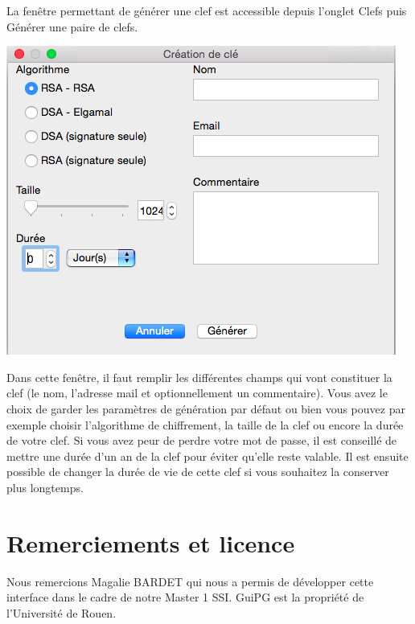 \documentclass[a4paper,11pt,french]{article}
\begin{document}
La fenêtre permettant de générer une clef est accessible depuis l'onglet Clefs puis Générer une paire de clefs. \bigbreak

\includegraphics[scale=0.5]{creation.png} \bigbreak


Dans cette fenêtre, il faut remplir les différentes champs qui vont constituer la clef (le nom, l'adresse mail et optionnellement un commentaire). 
Vous avez le choix de garder les paramètres de génération par défaut ou bien vous pouvez par exemple choisir l'algorithme de chiffrement, la taille de la clef ou encore
la durée de votre clef. Si vous avez peur de perdre votre mot de passe, il est conseillé de mettre une durée d'un an de la clef pour éviter qu'elle reste valable. Il est
ensuite possible de changer la durée de vie de cette clef si vous souhaitez la conserver plus longtemps.

\section{Remerciements et licence}

Nous remercions Magalie BARDET qui nous a permis de développer cette interface dans le cadre de notre Master 1 SSI. GuiPG est la propriété de l'Université de Rouen.
\end{document}
